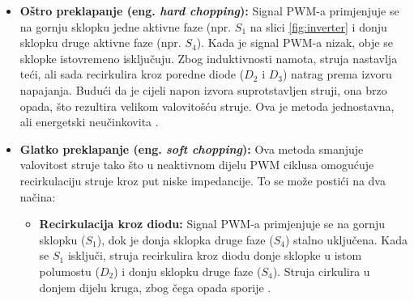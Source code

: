 \documentclass[diplomskirad]{fer}
\begin{document}
\begin{itemize}
	\item \textbf{Oštro preklapanje (eng. \textit{hard chopping}):}
	      Signal PWM-a primjenjuje se na gornju sklopku jedne aktivne faze (npr. $S_1$ na slici
	      \ref{fig:inverter} i donju sklopku druge aktivne faze (npr. $S_4$). Kada je signal PWM-a nizak, obje se sklopke istovremeno isključuju. Zbog induktivnosti namota,
	      struja nastavlja teći, ali sada recirkulira kroz poredne diode ($D_2$ i $D_3$) natrag
	      prema izvoru napajanja. Budući da je cijeli napon izvora suprotstavljen struji,
	      ona brzo opada, što rezultira velikom valovitošću struje. Ova je metoda
	      jednostavna, ali energetski neučinkovita \cite{TI2015}.

	\item \textbf{Glatko preklapanje (eng. \textit{soft chopping}):}
	      Ova metoda smanjuje valovitost struje tako što u neaktivnom dijelu PWM
	      ciklusa omogućuje recirkulaciju struje kroz put niske impedancije. To se
	      može postići na dva načina:
	      \begin{itemize}
		      \item \textbf{Recirkulacija kroz diodu:} Signal PWM-a primjenjuje se na
		            gornju sklopku ($S_1$), dok je donja sklopka druge faze ($S_4$) stalno
		            uključena. Kada se $S_1$ isključi, struja recirkulira kroz diodu donje
		            sklopke u istom polumostu ($D_2$) i donju sklopku druge faze ($S_4$).
		            Struja cirkulira u donjem dijelu kruga, zbog čega opada sporije \cite{TI2015}.


\end{itemize}
\end{itemize}
\end{document}
